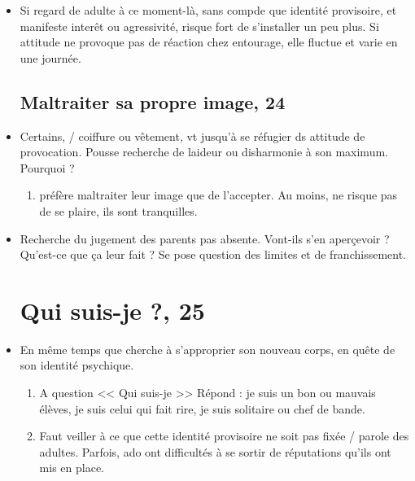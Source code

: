\documentclass[12pt]{report}
\begin{document}
\begin{itemize}
\item Si regard de adulte à ce moment-là, sans compde que identité provisoire, et manifeste interêt ou agressivité, risque fort de s'installer un peu plus. Si attitude ne provoque pas de réaction chez entourage, elle fluctue et varie en une journée. \\


\subsection{Maltraiter sa propre image, 24}

\item Certains, / coiffure ou vêtement, vt jusqu'à se réfugier ds attitude de provocation. Pousse recherche de laideur ou disharmonie à son maximum. Pourquoi ?
\begin{enumerate}
\item préfère maltraiter leur image que de l'accepter. Au moins, ne risque pas de se plaire, ils sont tranquilles.\\
\end{enumerate}

\item Recherche du jugement des parents pas absente. Vont-ils s'en aperçevoir ? Qu'est-ce que ça leur fait ? Se pose question des limites et de franchissement.

\section{Qui suis-je ?, 25}

\item En même temps que cherche à s'approprier son nouveau corps, en quête de son identité psychique.
\begin{enumerate}
\item A question << Qui suis-je >> Répond : je suis un bon ou mauvais élèves, je suis celui qui fait rire, je suis solitaire ou chef de bande.\\
\item Faut veiller à ce que cette identité provisoire ne soit pas fixée / parole des adultes. Parfois, ado ont difficultés à se sortir de réputations qu'ils ont mis en place. \\
\end{enumerate}


\end{itemize}
\end{document}
